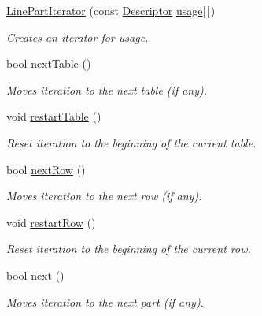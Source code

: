 \begin{DoxyCompactItemize}
\item 
\hyperlink{class_option_parser_1_1_print_usage_implementation_1_1_line_part_iterator_a7696a3ac62951caddc7853824cf31dac}{Line\-Part\-Iterator} (const \hyperlink{struct_option_parser_1_1_descriptor}{Descriptor} \hyperlink{_selective_community_detection-_x_8cpp_ae4e685e845abde182eb8fc1f87b756ae}{usage}\mbox{[}$\,$\mbox{]})
\begin{DoxyCompactList}\small\item\em Creates an iterator for {\ttfamily usage}. \end{DoxyCompactList}\item 
bool \hyperlink{class_option_parser_1_1_print_usage_implementation_1_1_line_part_iterator_a4f3a60ab882ab40ae961e3ed49d706ae}{next\-Table} ()
\begin{DoxyCompactList}\small\item\em Moves iteration to the next table (if any). \end{DoxyCompactList}\item 
void \hyperlink{class_option_parser_1_1_print_usage_implementation_1_1_line_part_iterator_a95508d086451c74a50d682ccc2e59450}{restart\-Table} ()
\begin{DoxyCompactList}\small\item\em Reset iteration to the beginning of the current table. \end{DoxyCompactList}\item 
bool \hyperlink{class_option_parser_1_1_print_usage_implementation_1_1_line_part_iterator_a329e6f5eca1a9376d63e1d6b99ecba29}{next\-Row} ()
\begin{DoxyCompactList}\small\item\em Moves iteration to the next row (if any). \end{DoxyCompactList}\item 
void \hyperlink{class_option_parser_1_1_print_usage_implementation_1_1_line_part_iterator_a4b7768a70db20da54569bd0b81be4294}{restart\-Row} ()
\begin{DoxyCompactList}\small\item\em Reset iteration to the beginning of the current row. \end{DoxyCompactList}\item 
bool \hyperlink{class_option_parser_1_1_print_usage_implementation_1_1_line_part_iterator_aa73c9df321f1101b9a0496af8eb7f9ae}{next} ()
\begin{DoxyCompactList}\small\item\em Moves iteration to the next part (if any). \end{DoxyCompactList}\item 

\end{DoxyCompactItemize}
